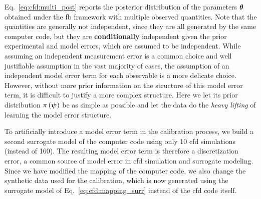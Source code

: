 Eq.~\eqref{eq:cfd:multi_post} reports the posterior distribution of the parameters $\boldsymbol{\theta}$ obtained under the \gls{fb} framework with multiple observed quantities. Note that the quantities are generally not independent, since they are all generated by the same computer code, but they are \textbf{conditionally} independent given the prior experimental and model errors, which are assumed to be independent. While assuming an independent measurement error is a common choice and well justifiable assumption in the vast majority of cases, the assumption of an independent model error term for each observable is a more delicate choice. However, without more prior information on the structure of this model error term, it is difficult to justify a more complex structure. Here we let its prior distribution $\pi \left( \boldsymbol{\psi}\right)$ be as simple as possible and let the data do the \textit{heavy lifting} of learning the model error structure.

\smallskip
To artificially introduce a model error term in the calibration process, we build a second surrogate model of the computer code using only 10 \gls{cfd} simulations (instead of 160). The resulting model error term is therefore a discretization error, a common source of model error in \gls{cfd} simulation and surrogate modeling. Since we have modified the mapping of the computer code, we also change the synthetic data used for the calibration, which is now generated using the surrogate model of Eq.~\eqref{eq:cfd:mapping_surr} instead of the \gls{cfd} code itself. 


